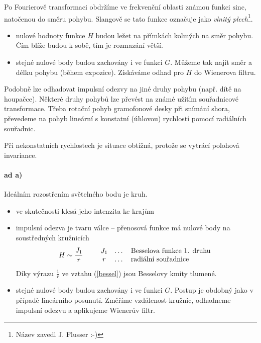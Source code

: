 Po Fourierově transformaci obdržíme ve frekvenční oblasti známou funkci $\mathrm{sinc}$, natočenou do směru pohybu. 
Slangově se tato funkce označuje jako {\em vlnitý plech}\footnote{Název zavedl J. Flusser :-)}. 

\begin{itemize}
\item nulové hodnoty funkce $H$ budou ležet na přímkách kolmých na směr pohybu. Čím blíže budou k sobě, tím je rozmazání 
větší. 
\item stejné nulové body budou zachovány i ve funkci $G$. Můžeme tak najít směr a délku pohybu (během
expozice). Získáváme odhad pro $H$ do Wienerova filtru. 
\end{itemize}

Podobně lze odhadovat impulsní odezvy na jiné druhy pohybu (např. dítě na houpačce). Některé druhy pohybů lze převést na
známé užitím souřadnicové transformace. Třeba rotační pohyb gramofonové desky při snímání shora, převedeme na pohyb 
lineární s konstatní (úhlovou) rychlostí pomocí radiálních souřadnic.

Při nekonstatních rychlostech je situace obtížná, protože se vytrácí polohová invariance.


\paragraph{ad a)} Ideálním rozostřením světelného bodu je kruh. 
\begin{itemize}
\item ve skutečnosti klesá jeho intenzita ke krajům
\item impulsní odezva je tvaru válce -- přenosová funkce má nulové body na soustředných kružnicích
  \begin{eqnarray}
    H\sim \frac{J_1}{r}\label{bessel}\qquad\begin{array}{ccl}\hbox{$J_1$}&\hbox{\dots}&\hbox{Besselova funkce 1. druhu}\\
    \hbox{$r$}&\hbox{\dots}&\hbox{radiální souřadnice}
    \end{array}
  \end{eqnarray}
Díky výrazu $\frac{1}{r}$ ve vztahu (\ref{bessel}) jsou Besselovy kmity tlumené.

\item stejné nulové body budou zachovány i ve funkci $G$. Postup je obdobný jako v případě lineárního posunutí.
Změříme vzdálenost kružnic, odhadneme impulsní odezvu a aplikujeme Wienerův filtr. 
\end{itemize}

